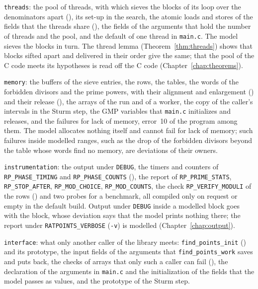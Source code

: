 \verb|threads|: the pool of threads, with which \ratpoints{} sieves the blocks of its loop over the
denominators apart (), its set-up in the search, the atomic loads
and stores of the fields that the threads share (), the fields of the
arguments that hold the number of threads and the pool, and the default of one thread in
\verb|main.c|. The model sieves the blocks in turn. The thread lemma (Theorem~\ref{thm:threads})
shows that blocks sifted apart and delivered in their order give the same; that the pool of the C
code meets its hypotheses is read off the C code (Chapter~\ref{chap:theorems}).

\verb|memory|: the buffers of the sieve entries, the rows, the tables, the words of the forbidden
divisors and the prime powers, with their alignment and enlargement
() and their release (), the
arrays of the run and of a worker, the copy of the caller's intervals in the Sturm step, the GMP
variables that \verb|main.c| initializes and releases, and the failures for lack of memory,
error~10 of the program among them. The model allocates nothing itself and cannot fail for lack of
memory; such failures inside modelled ranges, such as the drop of the forbidden divisors beyond
the table whose words find no memory, are deviations of their owners.

\verb|instrumentation|: the output under \verb|DEBUG|, the timers and counters of
\verb|RP_PHASE_TIMING| and \verb|RP_PHASE_COUNTS| (), the report of
\verb|RP_PRIME_STATS|, \verb|RP_STOP_AFTER|, \verb|RP_MOD_CHOICE|, \verb|RP_MOD_COUNTS|, the check
\verb|RP_VERIFY_MODULI| of the rows () and two probes for a benchmark,
all compiled only on request or empty in the default build. Output under \verb|DEBUG| inside a
modelled block goes with the block, whose deviation says that the model prints nothing there; the
report under \verb|RATPOINTS_VERBOSE| (\verb|-v|) is modelled (Chapter~\ref{chap:output}).

\verb|interface|: what only another caller of the library meets: \verb|find_points_init|
() and its prototype, the input fields of the arguments that
\verb|find_points_work| saves and puts back, the checks of arrays that only such a caller can fail
(), the declaration of the arguments in \verb|main.c| and the
initialization of the fields that the model passes as values, and the prototype of the Sturm step.


